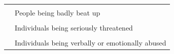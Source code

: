 \documentclass[utf8]{article}
\begin{document}
\begin{table}[]
{\begin{tabular}{ll}
                                                                                                                                                                                                                                                 &                                                                                                                                                                                                       \\
                                                                                                                                                                                                                                                 & People being badly beat up                                                                                                                                                                            \\
                                                                                                                                                                                                                                                 &                                                                                                                                                                                                       \\
                                                                                                                                                                                                                                                 & Individuals being seriously threatened                                                                                                                                                                \\
                                                                                                                                                                                                                                                 &                                                                                                                                                                                                       \\
                                                                                                                                                                                                                                                 & Individuals being verbally or emotionally abused                                                                                                                                                      \\

\end{tabular}}
\end{table}
\end{document}
